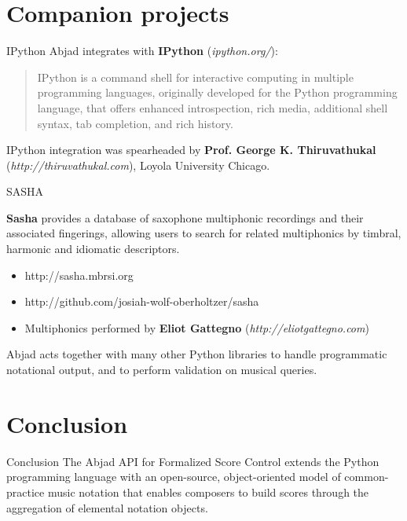 \documentclass[10pt]{beamer}
\begin{document}
\section{Companion projects}

\begin{frame}{IPython}
Abjad integrates with \textbf{IPython} (\emph{ipython.org/}):

\begin{quote}
IPython is a command shell for interactive computing in multiple programming
languages, originally developed for the Python programming language, that
offers enhanced introspection, rich media, additional shell syntax, tab
completion, and rich history.
\end{quote}

IPython integration was spearheaded by \textbf{Prof. George K. Thiruvathukal}
(\emph{http://thiruvathukal.com}), Loyola University Chicago. 
\end{frame}

\begin{frame}{SASHA}

\textbf{Sasha} provides a database of saxophone multiphonic recordings and
their associated fingerings, allowing users to search for related multiphonics
by timbral, harmonic and idiomatic descriptors.

\begin{itemize}
    \item http://sasha.mbrsi.org
    \item http://github.com/josiah-wolf-oberholtzer/sasha
    \item Multiphonics performed by \textbf{Eliot Gattegno}
        (\emph{http://eliotgattegno.com})
\end{itemize}

Abjad acts together with many other Python libraries to handle programmatic
notational output, and to perform validation on musical queries.

\end{frame}

\section{Conclusion}

\begin{frame}{Conclusion}
The Abjad API for Formalized Score Control extends the Python programming
language with an open-source, object-oriented model of common-practice music
notation that enables composers to build scores through the aggregation of
elemental notation objects.
\end{frame}
\end{document}
